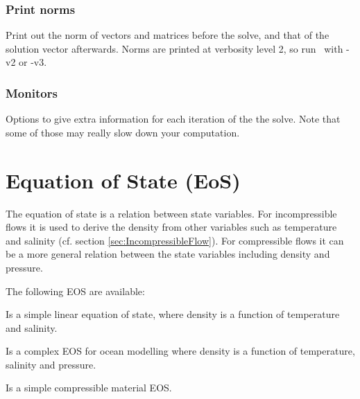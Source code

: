 \subsubsection{Print norms}
Print out the norm of vectors and matrices before the solve, and that of the solution vector afterwards. Norms are printed at verbosity level 2, so run \fluidity\ with -v2 or -v3.

\subsubsection{Monitors}
Options to give extra information for each iteration of the the solve. Note that some of those may really slow down your computation. 


\section{Equation of State (EoS)}\label{sec:ConfigEOS}

The equation of state is a relation between state 
variables. For incompressible flows it is used to derive the density
from other variables such as temperature and salinity (cf. section \ref{sec:IncompressibleFlow}). For compressible
flows it can be a more general relation between the state variables
including density and pressure.

The following EOS are available:

\begin{description}
\item{} 
Is a simple linear equation of state,
where density is a function of temperature and salinity.

\item{} Is a complex EOS for ocean modelling where density is a function of temperature, salinity and pressure.
\item{} Is a simple compressible material EOS.
\end{description}

